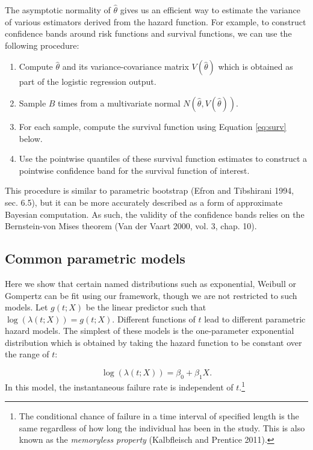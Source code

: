 The asymptotic normality of \(\widehat{\theta}\) gives us an efficient way to estimate the variance of various estimators derived from the hazard function. For example, to construct confidence bands around risk functions and survival functions, we can use the following procedure:

\begin{enumerate}
\def\labelenumi{\arabic{enumi}.}
\tightlist
\item
  Compute \(\widehat{\theta}\) and its variance-covariance matrix \(V(\widehat \theta)\) which is obtained as part of the logistic regression output.
\item
  Sample \(B\) times from a multivariate normal \(N\left(\widehat{\theta}, V(\widehat\theta)\right)\).
\item
  For each sample, compute the survival function using Equation \eqref{eq:surv} below.
\item
  Use the pointwise quantiles of these survival function estimates to construct a pointwise confidence band for the survival function of interest.
\end{enumerate}

This procedure is similar to parametric bootstrap (Efron and Tibshirani 1994, sec. 6.5), but it can be more accurately described as a form of approximate Bayesian computation. As such, the validity of the confidence bands relies on the Bernstein-von Mises theorem (Van der Vaart 2000, vol. 3, chap. 10).

\hypertarget{common-parametric-models}{%
\subsection{Common parametric models}\label{common-parametric-models}}

Here we show that certain named distributions such as exponential, Weibull or Gompertz can be fit using our framework, though we are not restricted to such models. Let \(g(t; X)\) be the linear predictor such that \(\log(\lambda(t;X)) = g(t; X)\). Different functions of \(t\) lead to different parametric hazard models. The simplest of these models is the one-parameter exponential distribution which is obtained by taking the hazard function to be constant over the range of \(t\):

\begin{equation}
\log(\lambda(t; X)) = \beta_0 + \beta_1 X. \label{eq:exp}
\end{equation}
In this model, the instantaneous failure rate is independent of \(t\).\footnote{The conditional chance of failure in a time interval of specified length is the same regardless of how long the individual has been in the study. This is also known as the \emph{memoryless property} (Kalbfleisch and Prentice 2011).}

